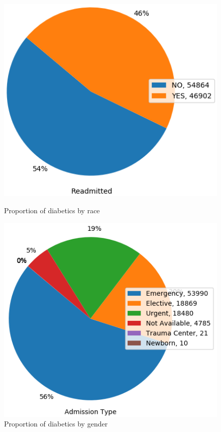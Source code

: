 \documentclass[11pt]{report}
\begin{document}
\begin{figure}[ht]
	\begin{minipage}[b]{.4\textwidth}
	\centering
	\includegraphics[width=1\textwidth]{readmitted_pie.png}
	\caption{Proportion of diabetics by race}
	\end{minipage}
	\hfill
	\begin{minipage}[b]{.4\textwidth}
	\centering
	\includegraphics[width=1\textwidth]{admission_type_pie.png}
\caption{Proportion of diabetics by gender}
\end{minipage}
\end{figure}
\end{document}
